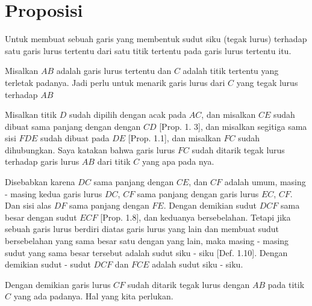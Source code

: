 \documentclass[a4paper]{book}
\begin{document}
\section*{\centering Proposisi \thesection} 
Untuk membuat sebuah garis yang membentuk sudut siku (tegak lurus) terhadap satu
garis lurus tertentu dari satu titik tertentu pada garis lurus tertentu itu.
\begin{center}
\end{center}

Misalkan $AB$ adalah garis lurus tertentu dan $C$ adalah titik tertentu yang
terletak padanya. Jadi perlu untuk menarik garis lurus dari $C$ yang tegak
lurus terhadap $AB$

Misalkan titik $D$ sudah dipilih dengan acak pada $AC$, dan misalkan $CE$ 
sudah dibuat sama panjang dengan dengan $CD$ [Prop. 1. 3], dan misalkan
segitiga sama sisi $FDE$ sudah dibuat pada $DE$ [Prop. 1.1], dan misalkan
$FC$ sudah dihubungkan. Saya katakan bahwa garis lurus $FC$ sudah ditarik
tegak lurus terhadap garis lurus $AB$ dari titik $C$ yang apa pada nya.

Disebabkan karena $DC$ sama panjang dengan $CE$, dan $CF$ adalah umum, 
masing - masing kedua garis lurus $DC$, $CF$ sama panjang dengan garis lurus
$EC$, $CF$. Dan sisi alas $DF$ sama panjang dengan $FE$. Dengan demikian
sudut $DCF$ sama besar dengan sudut $ECF$ [Prop. 1.8], dan keduanya 
bersebelahan. Tetapi jika sebuah garis lurus berdiri diatas garis lurus
yang lain dan membuat sudut bersebelahan yang sama besar satu dengan yang
lain, maka masing - masing sudut yang sama besar tersebut adalah sudut
siku - siku [Def. 1.10]. Dengan demikian sudut - sudut
$DCF$ dan $FCE$ adalah sudut siku - siku.

Dengan demikian garis lurus $CF$ sudah ditarik tegak lurus dengan
$AB$ pada titik $C$ yang ada padanya. Hal yang kita perlukan.


\end{document}
